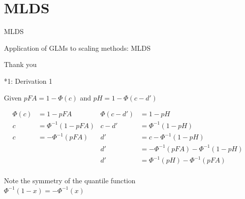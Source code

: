 \documentclass[10pt]{beamer}
\begin{document}
\section{MLDS}
\begin{frame}{MLDS}

Application of GLMs to scaling methods: MLDS




\end{frame}


\begin{frame}
\begin{center}
{\Huge Thank you}
\end{center}
\end{frame}


\begin{frame}{*1: Derivation 1}
\begin{center}
Given $pFA = 1 - \Phi(c)$ and $pH = 1 - \Phi(c - d')$

\begin{align*}
\Phi(c) & = 1 - pFA & \Phi(c - d') & = 1 - pH\\
c & = \Phi^{-1}(1 - pFA) & c - d' & = \Phi^{-1}(1 - pH) \\
c & = -\Phi^{-1}(pFA)  &  d' & = c - \Phi^{-1}(1 - pH)  \\
& & d' & = -\Phi^{-1}(pFA)  - \Phi^{-1}(1 - pH) \\
& & d' & = \Phi^{-1}(pH) - \Phi^{-1}(pFA)\\
\end{align*}

Note the symmetry of the quantile function\\
$\Phi^{-1}(1-x) = -\Phi^{-1}(x)$
\end{center}
\end{frame}
\end{document}
